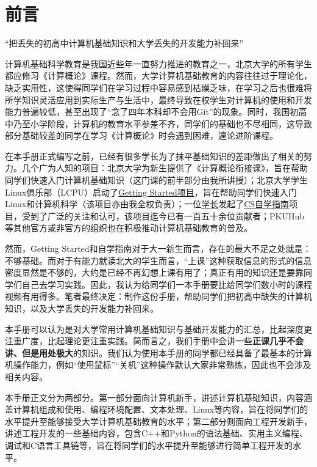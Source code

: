 \documentclass[../main.tex]{subfiles}
\begin{document}
\chapter{前言}

\begin{center}
  {\kaishu “把丢失的初高中计算机基础知识和大学丢失的开发能力补回来” }
\end{center}

计算机基础科学教育是我国近些年一直努力推进的教育之一，北京大学的所有学生都应修习《计算概论》课程。然而，大学计算机基础教育的内容往往过于理论化，缺乏实用性，这使得同学们在学习过程中容易感到枯燥乏味，在学习之后也很难将所学知识灵活应用到实际生产与生活中，最终导致在校学生对计算机的使用和开发能力普遍较低，甚至出现了“念了四年本科却不会用Git”的现象。同时，我国初高中乃至小学阶段，计算机的教育水平参差不齐，同学们的基础也不尽相同，这导致部分基础较差的同学在学习《计算概论》时会遇到困难，遑论进阶课程。

在本手册正式编写之前，已经有很多学长为了抹平基础知识的差距做出了相关的努力。几个广为人知的项目：北京大学为新生提供了《计算概论衔接课》，旨在帮助同学们快速入门计算机基础知识（这门课的前半部分由我所讲授）；北京大学学生Linux俱乐部（LCPU）启动了\href{missing.lcpu.dev}{Getting Started项目}，旨在帮助同学们快速入门Linux和计算机科学（该项目亦由我全权负责）；一位\faGithub\href{https://github.com/PKUFlyingPig}{学长}发起了\href{https://csdiy.wiki/}{CS自学指南}项目，受到了广泛的关注和认可，该项目迄今已有一百五十余位贡献者；PKUHub等其他官方或非官方的组织也在积极推动计算机基础教育的普及。

然而，Getting Started和自学指南对于大一新生而言，存在的最大不足之处就是：不够基础。而对于有能力就读北大的学生而言，“上课”这种获取信息的形式的信息密度显然是不够的，大约是已经不再幻想上课有用了；真正有用的知识还是要靠同学们自己去学习实践。因此，我认为给同学们一本手册要比给同学们数小时的课程视频有用得多。笔者最终决定：制作这份手册，帮助同学们把初高中缺失的计算机知识，以及大学丢失的开发能力补回来。

本手册可以认为是对大学常用计算机基础知识与基础开发能力的汇总，比起深度更注重广度，比起理论更注重实践。简而言之，我们手册中会讲一些\textbf{正课几乎不会讲、但是用处极大}的知识。我们认为使用本手册的同学都已经具备了最基本的计算机操作能力，例如“使用鼠标”“关机”这种操作默认大家非常熟练，因此也不会涉及相关内容。

本手册正文分为两部分。第一部分面向计算机新手，讲述计算机基础知识，内容涵盖计算机组成和使用、编程环境配置、文本处理、Linux等内容，旨在将同学们的水平提升至能够接受大学计算机基础教育的水平；第二部分则面向工程开发新手，讲述工程开发的一些基础内容，包含C++和Python的语法基础、实用主义编程、调试和C语言工具链等，旨在将同学们的水平提升至能够进行简单工程开发的水平。
\end{document}
